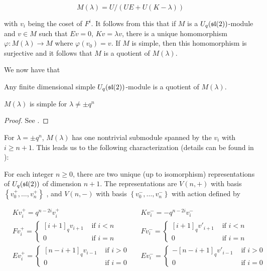 \begin{equation}
    M(\lambda) = U/(UE + U(K-\lambda))
\end{equation}

with $v_i$ being the coset of $F^i$. It follows from this that if $M$ is a
$U_q(\mathfrak{sl}(2))$-module and $v \in M$ such that $Ev = 0$, $Kv = \lambda v$, there
is a unique homomorphism $\varphi: M(\lambda) \to M$ where $\varphi(v_0) = v$.
If $M$ is simple, then this homomorphism is surjective and it follows that $M$
is a quotient of $M(\lambda)$. 

We now have that 
\begin{claim}
    Any finite dimensional simple $U_q(\mathfrak{sl}(2))$-module is a quotient of $M(\lambda)$.
\end{claim}

\begin{claim}
    $M(\lambda)$ is simple for $\lambda \neq \pm q^n$
\end{claim}

\begin{proof}
    See \cite{Jantzen1996}.
\end{proof}

For $\lambda = \pm q^{n}$, $M(\lambda)$ has one nontrivial submodule spanned by the $v_i$ with $i \geq n+1$.
This leads us to the following characterization (details can be found in \cite{Jantzen1996}):


For each integer $n \geq 0$, there are two unique (up to isomorphism)
representations of $U_q(\mathfrak{sl}(2))$ of dimension $n+1$. 
The representations are $V(n,+)$ with basis $\left\{ v^+_0, \ldots, v^+_n
\right\}$ , and $V(n,-)$ with basis $\left\{ v^-_0, \ldots, v^-_n \right\}$
with action defined by 

\begin{align*}
    &K v^+_i = q^{n-2i} v^+_i  &
    &K v^-_i = -q^{n-2i} v^-_i \\
    &F v^+_i = \begin{cases} [i+1]_qv_{i+1}& \text{ if $i < n$} \\ 0& \text{ if $i = n$} \end{cases} &
    &F v^-_i = \begin{cases} [i+1]_qv'_{i+1}& \text{ if $i < n$} \\ 0& \text{ if $i = n$} \end{cases} \\
    &E v^+_i = \begin{cases} 
                     [n-i+1]_qv_{i-1}& \text{ if $i > 0$} \\ 
                    0& \text{ if $i = 0$} 
             \end{cases} &
    &E v^-_i = \begin{cases} 
                    -[n-i+1]_q v'_{i-1}& \text{ if $i > 0$} \\ 
                    0& \text{ if $i = 0$} 
             \end{cases}
\end{align*}

